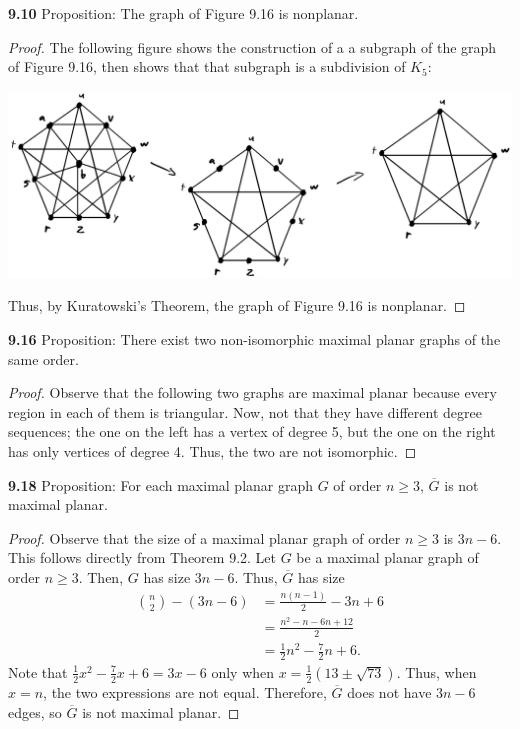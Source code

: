 \documentclass[12pt]{article}
\begin{document}
\newpage\noindent\textbf{9.10} Proposition: The graph of Figure 9.16 is nonplanar.
\begin{proof}
    The following figure shows the construction of a a subgraph of the graph of Figure 9.16, then shows that that subgraph is a subdivision of $K_5$:
    \begin{center}\includegraphics[scale=.5]{910.png}\end{center}
        Thus, by Kuratowski's Theorem, the graph of Figure 9.16 is nonplanar.
\end{proof}

\newpage\noindent\textbf{9.16} Proposition: There exist two non-isomorphic maximal planar graphs of the same order.
\begin{proof}
    Observe that the following two graphs are maximal planar because every region in each of them is triangular.
    Now, not that they have different degree sequences; the one on the left has a vertex of degree 5, but the one on the right has only vertices of degree 4.
    Thus, the two are not isomorphic.
\end{proof}

\newpage\noindent\textbf{9.18} Proposition: For each maximal planar graph $G$ of order $n\geq 3$, $\overline G$ is not maximal planar.
\begin{proof}
    Observe that the size of a maximal planar graph of order $n \geq 3$ is $3n - 6$.
    This follows directly from Theorem 9.2.
    Let $G$ be a maximal planar graph of order $n \geq 3$.
    Then, $G$ has size $3n-6$.
    Thus, $\overline G$ has size
    \begin{align*}
        {n \choose 2} - (3n-6) &= \frac{n(n-1)}2-3n+6 \\
                               &= \frac{n^2-n-6n+12}2 \\
                               &= \frac12n^2-\frac72n+6.
    \end{align*}
    Note that $\frac12x^2-\frac72x+6 = 3x-6$ only when $x=\frac12(13\pm\sqrt{73})$.
    Thus, when $x=n$, the two expressions are not equal.
    Therefore, $\overline G$ does not have $3n-6$ edges, so $\overline G$ is not maximal planar.
\end{proof}
\end{document}
